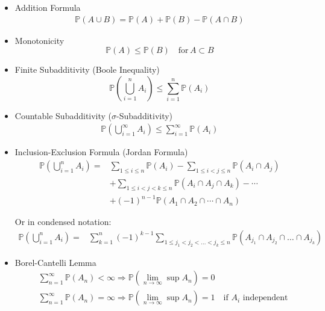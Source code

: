     \begin{itemize}
        \item Addition Formula
        \begin{align}
            \mathbb{P}\left( A\cup B \right) =\mathbb{P}\left( A \right) +\mathbb{P}\left( B \right) -\mathbb{P}\left( A\cap B \right)  
        \end{align}
        \item Monotonicity
        \begin{equation}    
            \mathbb{P}(A)\leq \mathbb{P}(B)\quad \text{for}\, A\subset B
        \end{equation}
        \item Finite Subadditivity (Boole Inequality)
        \begin{equation}    
            \mathbb{P}(\bigcup_{i=1}^nA_i)\leq\sum_{i=1}^n \mathbb{P}(A_i)    
        \end{equation}
        \item Countable Subadditivity ($ \sigma  $-Subadditivity)
        \begin{align}
            \mathbb{P}(\bigcup_{i=1}^\infty A_i)\leq\sum_{i=1}^\infty \mathbb{P}(A_i)  
        \end{align}
        
        
        \item Inclusion-Exclusion Formula (Jordan Formula)
        \begin{align}
            \mathbb{P}(\bigcup_{i=1}^nA_i)=&\sum_{1\leq i\leq n}\mathbb{P}(A_i)-\sum_{1\leq i<j\leq n}\mathbb{P}(A_i\cap A_j)\\
            &+\sum_{1\leq i<j<k\leq n}\mathbb{P}(A_i\cap A_j\cap A_k)-\cdots\\
            &+(-1)^{n-1}\mathbb{P}(A_1 \cap A_2\cap\cdots \cap A_n)
        \end{align}

        Or in condensed notation:
        \begin{align}
            \mathbb{P}( \bigcup_{i=1}^n A_i)=&\sum_{k=1}^n (-1)^{k-1}\sum_{1\leq j_1<j_2<\ldots<j_k\leq n}\mathbb{P}\left( A_{j_1}\cap A_{j_2}\cap\ldots\cap A_{j_k} \right)   
        \end{align}
        
        
        \item Borel-Cantelli Lemma
        \begin{align}
            &\sum_{n=1}^\infty \mathbb{P}(A_n)<\infty\Rightarrow \mathbb{P}(\lim_{n\to\infty}\sup A_n)=0\\
            &\sum_{n=1}^\infty \mathbb{P}(A_n)=\infty\Rightarrow \mathbb{P}(\lim_{n\to\infty}\sup A_n)=1\quad \text{if }A_i\text{ independent}
        \end{align}
            
    \end{itemize}


